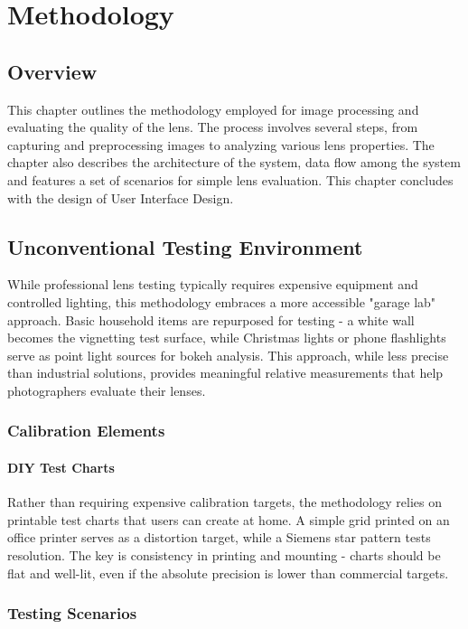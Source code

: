 \chapter{Methodology}

\section{Overview}
This chapter outlines the methodology employed for image processing and evaluating the quality of the lens. The process involves several steps, from capturing and preprocessing images to analyzing various lens properties. The chapter also describes the architecture of the system, data flow among the system and features a set of scenarios for simple lens evaluation. This chapter concludes with the design of User Interface Design.

\section{Unconventional Testing Environment}
While professional lens testing typically requires expensive equipment and controlled lighting, this methodology embraces a more accessible "garage lab" approach. Basic household items are repurposed for testing - a white wall becomes the vignetting test surface, while Christmas lights or phone flashlights serve as point light sources for bokeh analysis. This approach, while less precise than industrial solutions, provides meaningful relative measurements that help photographers evaluate their lenses.

\subsection{Calibration Elements}
\subsubsection{DIY Test Charts}
Rather than requiring expensive calibration targets, the methodology relies on printable test charts that users can create at home. A simple grid printed on an office printer serves as a distortion target, while a Siemens star pattern tests resolution. The key is consistency in printing and mounting - charts should be flat and well-lit, even if the absolute precision is lower than commercial targets.

\subsection{Testing Scenarios}

